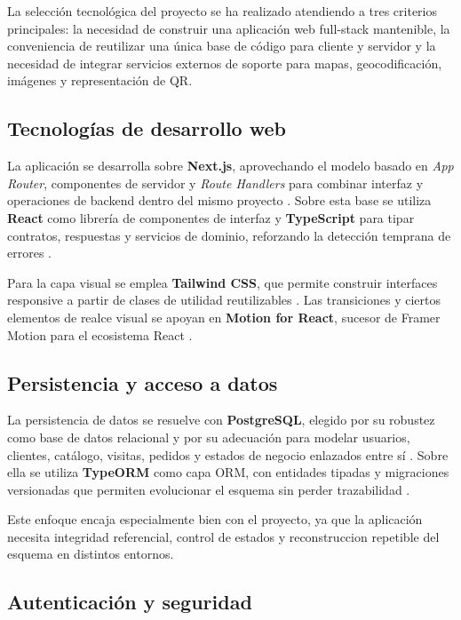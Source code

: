 La selección tecnológica del proyecto se ha realizado atendiendo a tres criterios principales: la necesidad de construir una aplicación web full-stack mantenible, la conveniencia de reutilizar una única base de código para cliente y servidor y la necesidad de integrar servicios externos de soporte para mapas, geocodificación, imágenes y representación de QR.

\subsection{Tecnologías de desarrollo web}

La aplicación se desarrolla sobre \textbf{Next.js}, aprovechando el modelo basado en \textit{App Router}, componentes de servidor y \textit{Route Handlers} para combinar interfaz y operaciones de backend dentro del mismo proyecto \citep{nextjsdocs2026,nextjsroutehandlers2026}. Sobre esta base se utiliza \textbf{React} como librería de componentes de interfaz \citep{reactdocs2026} y \textbf{TypeScript} para tipar contratos, respuestas y servicios de dominio, reforzando la detección temprana de errores \citep{typescriptdocs2026}.

Para la capa visual se emplea \textbf{Tailwind CSS}, que permite construir interfaces responsive a partir de clases de utilidad reutilizables \citep{tailwinddocs2026}. Las transiciones y ciertos elementos de realce visual se apoyan en \textbf{Motion for React}, sucesor de Framer Motion para el ecosistema React \citep{motionreactdocs2026}.

\subsection{Persistencia y acceso a datos}

La persistencia de datos se resuelve con \textbf{PostgreSQL}, elegido por su robustez como base de datos relacional y por su adecuación para modelar usuarios, clientes, catálogo, visitas, pedidos y estados de negocio enlazados entre sí \citep{postgresdocs2026}. Sobre ella se utiliza \textbf{TypeORM} como capa ORM, con entidades tipadas y migraciones versionadas que permiten evolucionar el esquema sin perder trazabilidad \citep{typeormentities2026,typeormmigrations2026}.

Este enfoque encaja especialmente bien con el proyecto, ya que la aplicación necesita integridad referencial, control de estados y reconstruccion repetible del esquema en distintos entornos.

\subsection{Autenticación y seguridad}

